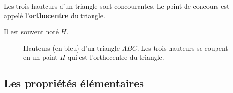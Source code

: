 \documentclass[a4paper, 12pt]{article}
\begin{document}
\begin{theoreme}{}{}
    Les trois hauteurs d'un triangle sont concourantes. Le point de concours est appelé l'\textbf{orthocentre} du triangle.
    
    Il est souvent noté $H$.
\end{theoreme}

\tikzexternalenable
\begin{figure}[H]
    \centering
    \resizebox{0.6\textwidth}{!}{%
    
    }
    \caption{Hauteurs (en bleu) d'un triangle $ABC$. Les trois hauteurs se coupent en un point $H$ qui est l'orthocentre du triangle.}
\end{figure}
\tikzexternaldisable

\subsection{Les propriétés élémentaires}
\end{document}
